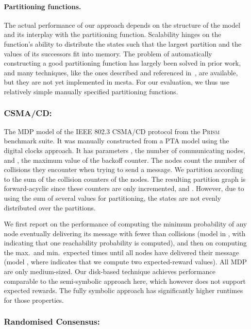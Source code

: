 \documentclass{llncs}
\newcommand{\mcsta}{\textsf{\mbox{mcsta}}\xspace}
\newcommand{\prism}{\textsc{Prism}\xspace}
\begin{document}
\paragraph{Partitioning functions.}
The actual performance of our approach depends on the structure of the model and its interplay with the partitioning function.
Scalability hinges on the function's ability to distribute the states such that the largest partition and the values of its successors fit into memory.
The problem of automatically constructing a good partitioning function has largely been solved in prior work, and many techniques, like the ones described and referenced in~\cite{EK13}, are available, but they are not yet implemented in \mcsta.
For our evaluation, we thus use relatively simple manually specified partitioning functions.



\subsubsection{CSMA/CD:}

The MDP model of the IEEE 802.3 CSMA/CD protocol from the \prism benchmark suite.
It was manually constructed from a PTA model using the digital clocks approach.
It has parameters , the number of communicating nodes, and , the maximum value of the backoff counter.
The nodes count the number of collisions they encounter when trying to send a message.
We partition according to the sum of the collision counters of the nodes.
The resulting partition graph is forward-acyclic since these counters are only incremented, and .
However, due to using the sum of several values for partitioning, the states are not evenly distributed over the partitions.

We first report on the performance of computing the minimum probability of any node eventually delivering its message with fewer than  collisions (model  in , with  indicating that one reachability probability is computed), and then on computing the max.\ and min.\ expected times until all nodes have delivered their message (model , where  indicates that we compute two expected-reward values).
All MDP are only medium-sized.
Our disk-based technique achieves performance comparable to the semi-symbolic approach here, which however does not support expected rewards.
The fully symbolic approach has significantly higher runtimes for those properties.


\subsubsection{Randomised Consensus:}
\end{document}
